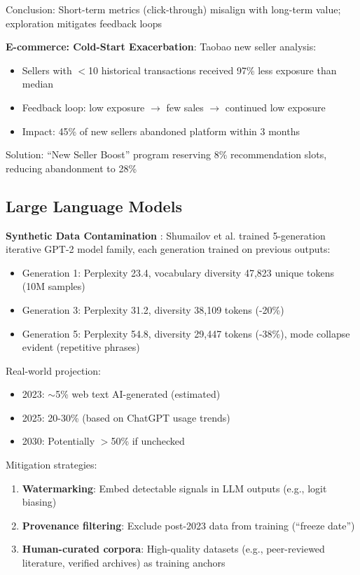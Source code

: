 \documentclass[11pt,a4paper]{article}
\begin{document}
Conclusion: Short-term metrics (click-through) misalign with long-term value; exploration mitigates feedback loops

\textbf{E-commerce: Cold-Start Exacerbation}:  
Taobao new seller analysis:  
\begin{itemize}
    \item Sellers with $<$10 historical transactions received 97\% less exposure than median  
    \item Feedback loop: low exposure $\rightarrow$ few sales $\rightarrow$ continued low exposure  
    \item Impact: 45\% of new sellers abandoned platform within 3 months
\end{itemize}

Solution: ``New Seller Boost'' program reserving 8\% recommendation slots, reducing abandonment to 28\%

\subsection{Large Language Models}

\textbf{Synthetic Data Contamination} \cite{ferrara2023,shumailov2024}:  
Shumailov et al. \cite{shumailov2024} trained 5-generation iterative GPT-2 model family, each generation trained on previous outputs:
\begin{itemize}
    \item Generation 1: Perplexity 23.4, vocabulary diversity 47,823 unique tokens (10M samples)  
    \item Generation 3: Perplexity 31.2, diversity 38,109 tokens (-20\%)  
    \item Generation 5: Perplexity 54.8, diversity 29,447 tokens (-38\%), mode collapse evident (repetitive phrases)
\end{itemize}

Real-world projection:  
\begin{itemize}
    \item 2023: $\sim$5\% web text AI-generated (estimated)  
    \item 2025: 20-30\% (based on ChatGPT usage trends)  
    \item 2030: Potentially $>$50\% if unchecked
\end{itemize}

Mitigation strategies:  
\begin{enumerate}
    \item \textbf{Watermarking}: Embed detectable signals in LLM outputs (e.g., logit biasing)  
    \item \textbf{Provenance filtering}: Exclude post-2023 data from training (``freeze date'')  
    \item \textbf{Human-curated corpora}: High-quality datasets (e.g., peer-reviewed literature, verified archives) as training anchors
\end{enumerate}
\end{document}
